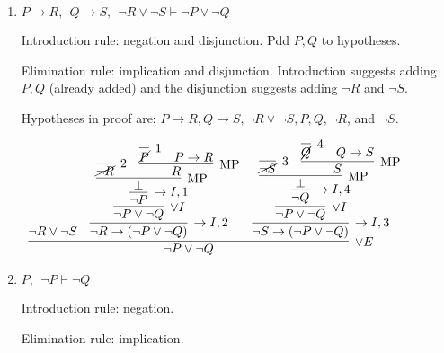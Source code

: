 \documentclass[11pt]{report}
\begin{document}
\begin{enumerate}
\begin{enumerate}
		\newpage
		\item $P \to R,\ \ Q \to S,\ \ \lnot R \lor \neg S \vdash \lnot P \lor \neg Q$
				
		\hspace{0.2cm}{\bf Solution}

		Introduction rule: negation and disjunction. Pdd $P,Q$ to hypotheses.
			
		\vspace{0.2cm}
			
		Elimination rule: implication and disjunction. Introduction suggests adding $P,Q$ (already added) and the disjunction suggests adding $\lnot R$ and $\lnot S$. 
		
		\vspace{0.2cm}

		Hypotheses in proof are: $P \to R, Q \to S, \lnot R \lor \neg S, P, Q, \lnot R$, and $\lnot S$. 

		\begin{mdframed}
			\begin{center}
				$\begin{array}{c}
					\infer[\lor E]{\lnot P \lor \lnot Q}
						{\lnot R \lor \lnot S
							&
						\infer[\to I,2]{\lnot R \to (\lnot P \lor \lnot Q)}
							{\infer[\lor I]{\lnot P \lor \lnot Q}
								{\infer[\to I,1]{\lnot P}
									{\infer[\MP]{\bot}
										{\infer[2]{\cancel{\lnot R}}{}
										&
										\infer[\MP]{R}
											{\infer[1]{\cancel{P}}{}
											&
											P \to R}}}}}
							&
						\infer[\to I,3]{\lnot S \to (\lnot P \lor \lnot Q)}
						{\infer[\lor I]{\lnot P \lor \lnot Q}
							{\infer[\to I,4]{\lnot Q}
								{\infer[\MP]{\bot}
									{\infer[3]{\cancel{\lnot S}}{}
									&
									\infer[\MP]{S}
										{\infer[4]{\cancel{Q}}{}
										&
										Q \to S}}}}}}
				\end{array}$
			\end{center}
		\end{mdframed}

		\item $P,\ \ \neg P \vdash  \neg Q$
				
		\hspace{0.2cm}{\bf Solution}

		Introduction rule: negation. 
			
		\vspace{0.2cm}
			
		Elimination rule: implication.
		
		\vspace{0.2cm}


\end{enumerate}
\end{enumerate}
\end{document}
